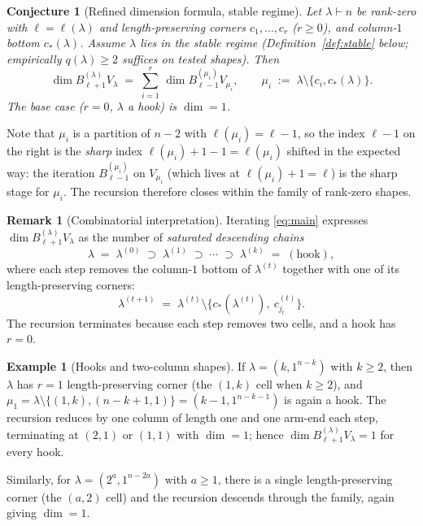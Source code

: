 \documentclass[11pt]{article}
\newtheorem{conjecture}[theorem]{Conjecture}
\theoremstyle{definition}
\newtheorem{remark}[theorem]{Remark}
\newtheorem{example}[theorem]{Example}
\begin{document}
\begin{conjecture}[Refined dimension formula, stable regime]\label{conj:main}
Let $\lambda \vdash n$ be rank-zero with $\ell = \ell(\lambda)$ and
length-preserving corners $c_1, \ldots, c_r$ ($r \ge 0$), and column-$1$
bottom $c_*(\lambda)$. \emph{Assume $\lambda$ lies in the stable regime}
(Definition~\ref{def:stable} below; empirically $q(\lambda) \ge 2$
suffices on tested shapes). Then
\begin{equation}\label{eq:main}
   \dim B_{\ell+1}^{(\lambda)} V_\lambda
   \;=\;
   \sum_{i=1}^{r}\,
   \dim B_{\ell-1}^{(\mu_i)} V_{\mu_i},
   \qquad
   \mu_i \;:=\; \lambda \setminus \{c_i, c_*(\lambda)\}.
\end{equation}
The base case ($r = 0$, $\lambda$ a hook) is $\dim = 1$.
\end{conjecture}

Note that $\mu_i$ is a partition of $n - 2$ with
$\ell(\mu_i) = \ell - 1$, so the index $\ell - 1$ on the right is the
\emph{sharp} index $\ell(\mu_i) + 1 - 1 = \ell(\mu_i)$ shifted in the
expected way: the iteration $B_{\ell - 1}^{(\mu_i)}$ on $V_{\mu_i}$
(which lives at $\ell(\mu_i) + 1 = \ell$) is the sharp stage for
$\mu_i$. The recursion therefore closes within the family of rank-zero
shapes.

\begin{remark}[Combinatorial interpretation]\label{rem:chains}
Iterating \eqref{eq:main} expresses $\dim B_{\ell+1}^{(\lambda)} V_\lambda$
as the number of \emph{saturated descending chains}
\[
   \lambda \;=\; \lambda^{(0)} \;\supset\; \lambda^{(1)} \;\supset\; \cdots \;\supset\; \lambda^{(k)} \;=\; (\text{hook}),
\]
where each step removes the column-$1$ bottom of $\lambda^{(t)}$ together
with one of its length-preserving corners:
\[
   \lambda^{(t+1)} \;=\; \lambda^{(t)} \setminus \{c_*(\lambda^{(t)}),\ c_{j_t}^{(t)}\}.
\]
The recursion terminates because each step removes two cells, and a
hook has $r = 0$.
\end{remark}

\begin{example}[Hooks and two-column shapes]\label{ex:hook}
If $\lambda = (k, 1^{n-k})$ with $k \ge 2$, then $\lambda$ has $r = 1$
length-preserving corner (the $(1, k)$ cell when $k \ge 2$), and
$\mu_1 = \lambda \setminus \{(1, k), (n-k+1, 1)\} = (k-1, 1^{n-k-1})$ is
again a hook. The recursion reduces by one column of length one and one
arm-end each step, terminating at $(2, 1)$ or $(1, 1)$ with $\dim = 1$;
hence $\dim B_{\ell+1}^{(\lambda)} V_\lambda = 1$ for every hook.

Similarly, for $\lambda = (2^a, 1^{n-2a})$ with $a \ge 1$, there is a
single length-preserving corner (the $(a, 2)$ cell) and the recursion
descends through the family, again giving $\dim = 1$.
\end{example}
\end{document}
